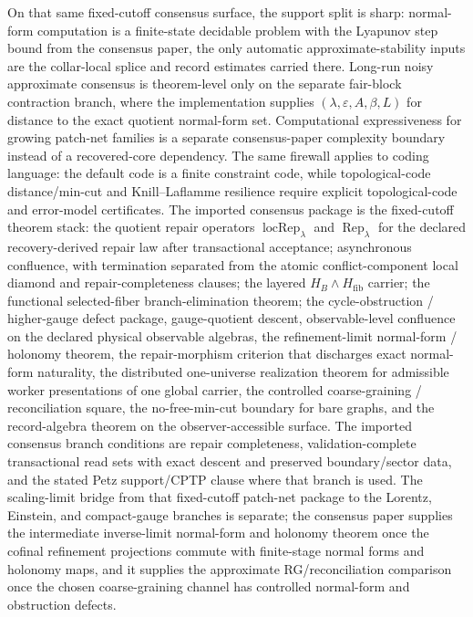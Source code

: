 \documentclass[11pt]{article}
\begin{document}
On that same fixed-cutoff consensus surface, the support split is sharp: normal-form computation is
a finite-state decidable problem with the Lyapunov step bound from the consensus paper, the only
automatic approximate-stability inputs are the collar-local splice and record estimates carried
there. Long-run noisy approximate consensus is theorem-level only on the separate fair-block
contraction branch, where the implementation supplies \((\lambda,\varepsilon,A,\beta,L)\) for
distance to the exact quotient normal-form set. Computational expressiveness for growing
patch-net families is a separate consensus-paper complexity boundary instead of a recovered-core
dependency. The same firewall applies to coding
language: the default code is a finite constraint code, while topological-code distance/min-cut and
Knill--Laflamme resilience require explicit topological-code and error-model certificates.
The imported consensus package is the fixed-cutoff theorem stack: the quotient repair operators
\(\operatorname{locRep}_\lambda\) and \(\operatorname{Rep}_\lambda\) for the declared
recovery-derived repair law after transactional acceptance; asynchronous confluence, with
termination separated from the atomic conflict-component local diamond and repair-completeness
clauses; the layered \(H_B\wedge H_{\mathrm{fib}}\) carrier; the functional selected-fiber
branch-elimination theorem; the cycle-obstruction / higher-gauge defect package,
gauge-quotient descent, observable-level confluence on the declared physical observable algebras,
the refinement-limit normal-form / holonomy theorem, the repair-morphism criterion that discharges
exact normal-form naturality, the distributed one-universe realization theorem for admissible
worker presentations of one global carrier, the controlled coarse-graining / reconciliation
square, the no-free-min-cut boundary for bare graphs, and the record-algebra theorem on the observer-accessible surface. The imported consensus
branch conditions are repair completeness, validation-complete transactional read sets with exact
descent and preserved boundary/sector data, and the stated Petz support/CPTP clause where that branch is used.
The scaling-limit bridge from that fixed-cutoff patch-net package to the Lorentz, Einstein, and
compact-gauge branches is separate; the consensus paper supplies the intermediate inverse-limit
normal-form and holonomy theorem once the cofinal refinement projections commute with finite-stage
normal forms and holonomy maps, and it supplies the approximate RG/reconciliation comparison once
the chosen coarse-graining channel has controlled normal-form and obstruction defects.
\end{document}
